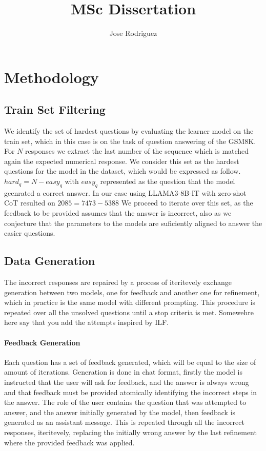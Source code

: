 \documentclass[a4paper,10pt]{article}
\title{MSc Dissertation}
\author{Jose Rodriguez}
\begin{document}
\maketitle

\begin{abstract}

\end{abstract}

\section{Methodology}

\subsection{Train Set Filtering}
We identify the set of hardest questions by evaluating the learner model on the train set, which in this case is on the task of question answering of the GSM8K. For $N$ responses we extract the last number of the sequence which is matched again the expected numerical response. We consider this set as the hardest questions for the model in the dataset, which would be expressed as follow. $ hard_q =  N - easy_q $ with $easy_q$ represented as the question that the model geenrated a correct answer.
In our case using LLAMA3-8B-IT with zero-shot CoT resulted on $ 2085 = 7473 - 5388 $ We proceed to iterate over this set, as the feedback to be provided assumes that the answer is incorrect, also as we conjecture that the parameters to the models are suficiently aligned to answer the easier questions.
\subsection{Data Generation}
The incorrect responses are repaired by a process of iteritevely exchange generation between two models, one for feedback and another one for refinement, which in practice is the same model with different prompting. This procedure is repeated over all the unsolved questions until a stop criteria is met. Somewehre here say that you add the attempts inspired by ILF.
\paragraph{Feedback Generation}
Each question has a set of feedback generated, which will be equal to the size of amount of iterations. Generation is done in chat format, firstly the model is instructed that the user will ask for feedback, and the answer is always wrong and that feedback must  be provided atomically identifying the incorrect steps in the answer. The role of the user contains the question that was attempted to answer, and the answer initially generated by the model, then feedback is generated as an assistant message. This is repeated through all the incorrect responses, iteritevely, replacing the initially wrong answer by the last refinement where the provided feedback was applied.
\end{document}
